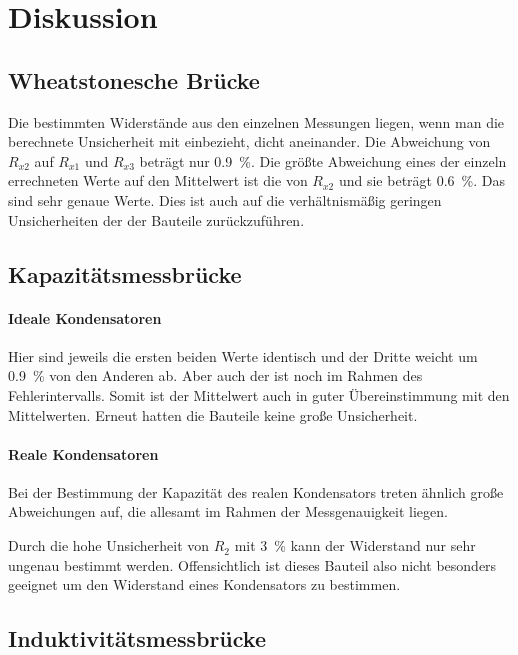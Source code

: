 \section{Diskussion}
\label{sec:Diskussion}

\subsection{Wheatstonesche Brücke}

Die bestimmten Widerstände aus den einzelnen Messungen liegen, wenn man die berechnete
Unsicherheit mit einbezieht, dicht aneinander. Die Abweichung von $R_{x2}$ auf $R_{x1}$
und $R_{x3}$ beträgt nur \SI{0.9}{\percent}. Die größte Abweichung eines der einzeln
errechneten Werte auf den Mittelwert ist die von $R_{x2}$ und sie beträgt \SI{0.6}{\percent}.
Das sind sehr genaue Werte.
Dies ist auch auf die verhältnismäßig geringen Unsicherheiten der
der Bauteile zurückzuführen.

\subsection{Kapazitätsmessbrücke}

\paragraph{Ideale Kondensatoren}
Hier sind jeweils die ersten beiden Werte identisch und der Dritte weicht um \SI{0.9}{\percent}
von den Anderen ab.
Aber auch der ist noch im Rahmen des Fehlerintervalls. Somit ist der Mittelwert
auch in guter Übereinstimmung mit den Mittelwerten. Erneut hatten die Bauteile
keine große Unsicherheit.

\paragraph{Reale Kondensatoren}
Bei der Bestimmung der Kapazität des realen Kondensators treten ähnlich große Abweichungen
auf, die allesamt im Rahmen der Messgenauigkeit liegen.

Durch die hohe Unsicherheit von $R_2$ mit \SI{3}{\percent} kann der Widerstand
nur sehr ungenau bestimmt werden. Offensichtlich ist dieses Bauteil also nicht
besonders geeignet um den Widerstand eines Kondensators zu bestimmen.

\subsection{Induktivitätsmessbrücke}

